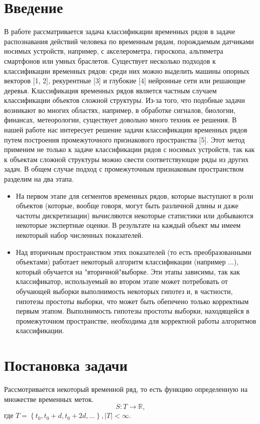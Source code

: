 \documentclass[a4paper,14pt]{extarticle}
\numberwithin{equation}{section}
\begin{document}
	\section{Введение}
	В работе рассматривается задача классификации временных рядов в задаче распознавания действий человека по временным рядам, порождаемым датчиками носимых устройств, например, с акселерометра, гироскопа, альтиметра смартфонов или умных браслетов. Существует несколько подходов к классификации временных рядов: среди них можно выделить машины опорных векторов [1, 2], рекурентные [3] и глубокие [4] нейронные сети или решающие деревья. Классификация временных рядов является частным случаем классификации объектов сложной структуры. Из-за того, что подобные задачи возникают во многих областях, например, в обработке сигналов, биологии, финансах, метеорологии, существует довольно много техник ее решения.
	В нашей работе нас интересует решение задачи классификации временных рядов путем построения промежуточного признакового пространства [5]. Этот метод применим не только к задаче классификации рядов с носимых устройств, так как к объектам сложной структуры можно свести соответствующие ряды из других задач. В общем случае подход с промежуточным признаковым пространством разделим на два этапа.
	\begin{itemize}
		\item На первом этапе для сегментов временных рядов, которые выступают в роли объектов (которые, вообще говоря, могут быть различной длины и даже частоты дискретизации) вычисляются некоторые статистики или добываются некоторые экспертные оценки. В результате на каждый объект мы имеем некоторый набор численных показателей.
		\item 	Над вторичным пространством этих показателей (то есть преобразованными объектами) работает некоторый алгоритм классификации (например ...), который обучается на "вторичной"выборке.
		Эти этапы зависимы, так как классификатор, используемый во втором этапе может потребовать от обучающей выборки выполнимость некоторых гипотез и, в частности, гипотезы простоты выборки, что может быть обепечено только корректным первым этапом. Выполнимость гипотезы простоты выборки, находящейся в промежуточном пространстве, необходима для корректной работы алгоритмов классификации.
	\end{itemize}
	
	
	\section*{Постановка задачи}
	Рассмотривается некоторый временной ряд, то есть функцию определенную на множестве временных меток. 
	\begin{equation}
		S:T\rightarrow\mathbb{R},
	\end{equation}
	где $T = \left\lbrace t_0,t_0+d,t_0+2d,\dots\right\rbrace, \left|T\right|< \infty$.
	
\end{document}
